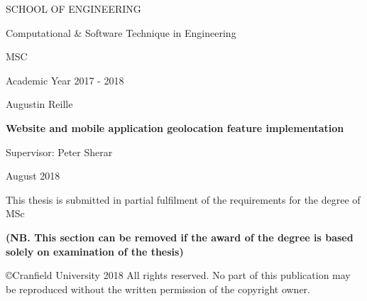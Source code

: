 \documentclass{article}
\begin{document}
        \begin{titlepage}
            \centering

            {\Large SCHOOL OF ENGINEERING}
            
            \vspace{.4cm}

            {\Large Computational \& Software Technique in Engineering}
            

            \vspace{2cm}
            
            {\Large MSC}
            
            \vspace{.2cm}
            
            {\Large Academic Year 2017 - 2018}

            \vspace{.2cm}
            
            {\Large Augustin Reille}
            

            \vspace{2cm}

            {\LARGE\bfseries Website and mobile application geolocation feature implementation}


            \vspace{2cm}


            {\Large Supervisor: Peter Sherar}
            
            \vspace{.2cm}
            
            {\Large August 2018}

            \vspace{2cm}


            \vfill
            {\large This thesis is submitted in partial fulfilment of the requirements for the degree of MSc}

            \vspace{.2cm}

            {\bfseries (NB. This section can be removed if the award of the degree is based solely on examination of the thesis)}

            \vspace{.2cm}

            {\large \copyright Cranfield University 2018 All rights reserved. No part of this publication may be reproduced without the written permission of the copyright owner.}

        \end{titlepage}
\end{document}
